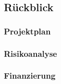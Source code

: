 \subsection{Rückblick}

\subsubsection{Projektplan}

\subsubsection{Risikoanalyse}

\subsubsection{Finanzierung}